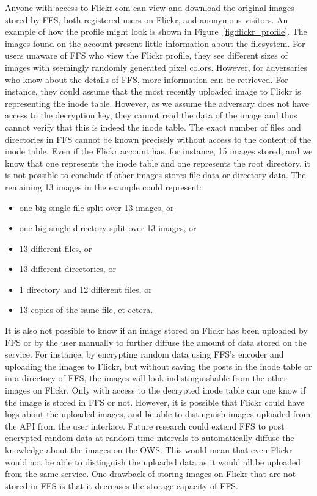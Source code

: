 Anyone with access to Flickr.com can view and download the original images stored by FFS, both registered users on Flickr, and anonymous visitors. An example of how the profile might look is shown in Figure~\ref{fig:flickr_profile}. The images found on the account present little information about the filesystem. For users unaware of FFS who view the Flickr profile, they see different sizes of images with seemingly randomly generated pixel colors. However, for adversaries who know about the details of FFS, more information can be retrieved. For instance, they could assume that the most recently uploaded image to Flickr is representing the inode table. However, as we assume the adversary does not have access to the decryption key, they cannot read the data of the image and thus cannot verify that this is indeed the inode table. The exact number of files and directories in FFS cannot be known precisely without access to the content of the inode table. Even if the Flickr account has, for instance, 15 images stored, and we know that one represents the inode table and one represents the root directory, it is not possible to conclude if other images stores file data or directory data. The remaining 13 images in the example could represent:
\begin{itemize}
	\item one big single file split over 13 images, or
	\item one big single directory split over 13 images, or
	\item 13 different files, or
	\item 13 different directories, or
	\item 1 directory and 12 different files, or
	\item 13 copies of the same file, et cetera.
\end{itemize}
It is also not possible to know if an image stored on Flickr has been uploaded by FFS or by the user manually to further diffuse the amount of data stored on the service. For instance, by encrypting random data using FFS's encoder and uploading the images to Flickr, but without saving the posts in the inode table or in a directory of FFS, the images will look indistinguishable from the other images on Flickr. Only with access to the decrypted inode table can one know if the image is stored in FFS or not. However, it is possible that Flickr could have logs about the uploaded images, and be able to distinguish images uploaded from the API from the user interface. Future research could extend FFS to post encrypted random data at random time intervals to automatically diffuse the knowledge about the images on the OWS. This would mean that even Flickr would not be able to distinguish the uploaded data as it would all be uploaded from the same service. One drawback of storing images on Flickr that are not stored in FFS is that it decreases the storage capacity of FFS.

